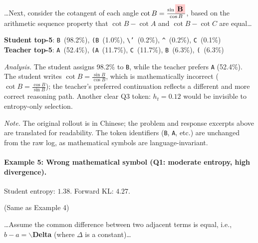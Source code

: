 \documentclass{article}
\begin{document}
\begin{tcolorbox}[colback=blue!3, colframe=black, boxrule=0.5pt, title={Student response (excerpt)}]
\small
\ldots Next, consider the cotangent of each angle $\cot B = \frac{\sin \colorbox{red!20}{\textbf{B}}}{\cos B}$, based on the arithmetic sequence property that $\cot B - \cot A$ and $\cot B - \cot C$ are equal\ldots
\end{tcolorbox}

\begin{tcolorbox}[colback=yellow!5, colframe=black, boxrule=0.5pt, title={Token distributions}]
\small
\textbf{Student top-5}: \texttt{B}~(98.2\%), \texttt{(B}~(1.0\%), \texttt{\textbackslash'}~(0.2\%), \texttt{\^{}}~(0.2\%), \texttt{C}~(0.1\%) \\
\textbf{Teacher top-5}: \texttt{A}~(52.4\%), \texttt{(A}~(11.7\%), \texttt{C}~(11.7\%), \texttt{B}~(6.3\%), \texttt{(}~(6.3\%)
\end{tcolorbox}

\noindent\textit{Analysis.}
The student assigns 98.2\% to \texttt{B}, while the teacher prefers \texttt{A} (52.4\%).
The student writes $\cot B = \frac{\sin B}{\cos B}$, which is mathematically incorrect ($\cot B = \frac{\cos B}{\sin B}$); the teacher's preferred continuation reflects a different and more correct reasoning path.
Another clear Q3 token: $h_t = 0.12$ would be invisible to entropy-only selection.

\smallskip\noindent\emph{Note.} The original rollout is in Chinese; the problem and response excerpts above are translated for readability. The token identifiers (\texttt{B}, \texttt{A}, etc.) are unchanged from the raw log, as mathematical symbols are language-invariant.

\paragraph{Example 5: Wrong mathematical symbol (\textbf{Q1}: moderate entropy, high divergence).}
Student entropy: $1.38$. Forward KL: $4.27$.

\begin{tcolorbox}[colback=gray!5, colframe=black, boxrule=0.5pt, title={Problem}]
(Same as Example 4)
\end{tcolorbox}

\begin{tcolorbox}[colback=blue!3, colframe=black, boxrule=0.5pt, title={Student response (excerpt)}]
\small
\ldots Assume the common difference between two adjacent terms is equal, i.e., $b - a = \backslash$\colorbox{red!20}{\textbf{Delta}} (where $\Delta$ is a constant)\ldots
\end{tcolorbox}
\end{document}
